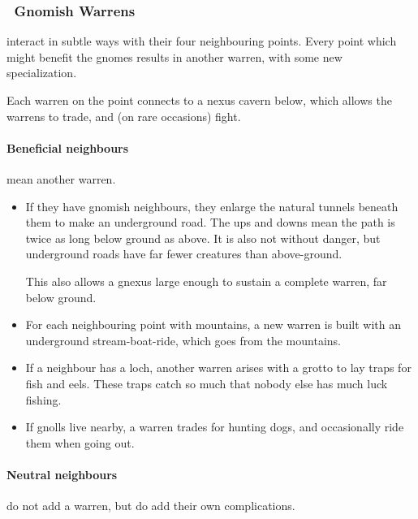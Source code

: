 \begin{multicols}{2}
\subsubsection[Gnomish Warrens]{\Gn\ Gnomish Warrens}
\label{gnomePoint}
interact in subtle ways with their four neighbouring points.
Every point which might benefit the gnomes results in another warren, with some new specialization.

Each warren on the point connects to a nexus cavern below, which allows the warrens to trade, and (on rare occasions) fight.

\paragraph{Beneficial neighbours}
mean another warren.

\begin{itemize}
  \item
  If they have gnomish neighbours, they enlarge the natural tunnels beneath them to make an underground road.
  The ups and downs mean the path is twice as long below ground as above.
  It is also not without danger, but underground roads have far fewer creatures than above-ground.

  This also allows a gnexus large enough to sustain a complete warren, far below ground.
  \item
  For each neighbouring point with mountains, a new warren is built with an underground stream-boat-ride, which goes from the mountains.
  \item
  If a neighbour has a loch, another warren arises with a grotto to lay traps for fish and eels.
  These traps catch so much that nobody else has much luck fishing.
  \item
  If gnolls live nearby, a warren trades for hunting dogs, and occasionally ride them when going out.
\end{itemize}

\paragraph{Neutral neighbours}
do not add a warren, but do add their own complications.


\end{multicols}
